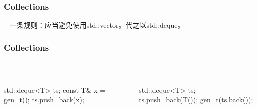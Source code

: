 \documentclass[UTF8,lualatex]{ctexbeamer}
\begin{document}
\begin{frame}
    \frametitle{Collections}
    \begin{alertblock}{~}
        一条规则：应当避免使用std::vector。代之以std::deque。
    \end{alertblock}
\end{frame}


\begin{frame}[fragile]
    \frametitle{Collections}
    \footnotesize
    \begin{columns}
        \begin{column}{.45\textwidth}
            \begin{exampleblock}{~}
                \begin{cppcode}
                    std::deque<T> ts;
                    const T& x = gen_t();
                    ts.push_back(x);
                \end{cppcode}
            \end{exampleblock}
        \end{column}
        \begin{column}{.45\textwidth}
            \begin{exampleblock}{~}
                \begin{cppcode}
                    std::deque<T> ts;
                    ts.push_back(T());
                    gen_t(ts.back());
                \end{cppcode}
            \end{exampleblock}
        \end{column}
    \end{columns}
\end{frame}

\end{document}

